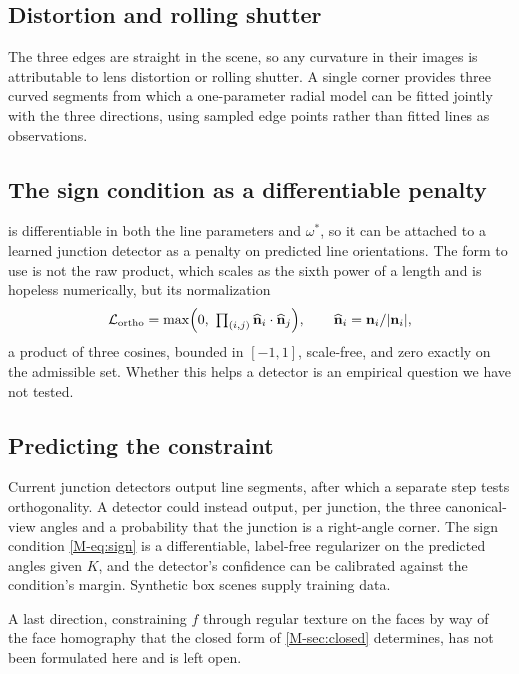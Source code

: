 \subsection{Distortion and rolling shutter}\label{sec:distortion}
The three edges are straight in the scene, so any curvature in their images is attributable to lens distortion or rolling shutter. A single corner provides three curved segments from which a one-parameter radial model can be fitted jointly with the three directions, using sampled edge points rather than fitted lines as observations.

\subsection{The sign condition as a differentiable penalty}\label{sec:difflearn}
 is differentiable in both the line parameters and $\omega^{*}$, so it can be attached to a learned junction detector as a penalty on predicted line orientations. The form to use is not the raw product, which scales as the sixth power of a length and is hopeless numerically, but its normalization
\[
\mathcal{L}_{\text{ortho}}=\max\Bigl(0,\ \textstyle\prod_{(i,j)}\widehat{\vn}_i\cdot\widehat{\vn}_j\Bigr),\qquad \widehat{\vn}_i=\vn_i/|\vn_i| ,
\]
a product of three cosines, bounded in $[-1,1]$, scale-free, and zero exactly on the admissible set. Whether this helps a detector is an empirical question we have not tested.

\subsection{Predicting the constraint}\label{sec:detector}
Current junction detectors output line segments, after which a separate step tests orthogonality. A detector could instead output, per junction, the three canonical-view angles and a probability that the junction is a right-angle corner. The sign condition \eqref{M-eq:sign} is a differentiable, label-free regularizer on the predicted angles given $K$, and the detector's confidence can be calibrated against the condition's margin. Synthetic box scenes supply training data.

A last direction, constraining $f$ through regular texture on the faces by way of the face homography that the closed form of \cref{M-sec:closed} determines, has not been formulated here and is left open.



